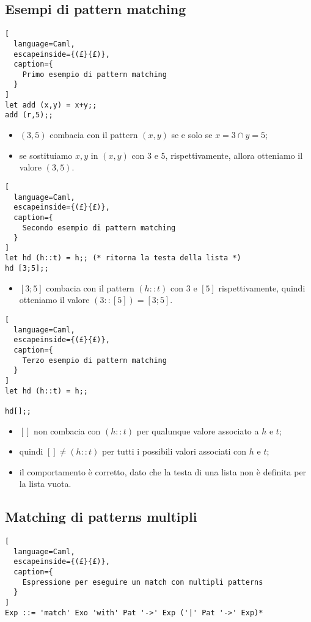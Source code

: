 \subsection{Esempi di pattern matching}
\begin{lstlisting}[
  language=Caml,
  escapeinside={(£}{£)},
  caption={
    Primo esempio di pattern matching
  }
]
let add (x,y) = x+y;;
add (r,5);;
\end{lstlisting}
\begin{itemize}
  \item $(3,5)$ combacia con il pattern $(x,y)$ se e solo se $x=3\cap
    y=5$;
  \item se sostituiamo $x,y$ in $(x,y)$ con $3$ e $5$,
    rispettivamente, allora otteniamo il valore $(3,5)$.
\end{itemize}

\begin{lstlisting}[
  language=Caml,
  escapeinside={(£}{£)},
  caption={
    Secondo esempio di pattern matching
  }
]
let hd (h::t) = h;; (* ritorna la testa della lista *)
hd [3;5];;
\end{lstlisting}
\begin{itemize}
  \item $[3;5]$ combacia con il pattern $(h::t)$ con $3$ e $[5]$
    rispettivamente, quindi otteniamo il valore $(3::[5])=[3;5]$.
\end{itemize}

\begin{lstlisting}[
  language=Caml,
  escapeinside={(£}{£)},
  caption={
    Terzo esempio di pattern matching
  }
]
let hd (h::t) = h;;

hd[];;
\end{lstlisting}
\begin{itemize}
  \item $[]$ non combacia con $(h::t)$ per qualunque valore associato a $h$ e
    $t$;
  \item quindi $[]\neq(h::t)$ per tutti i possibili valori associati con $h$ e
    $t$;
  \item il comportamento è corretto, dato che la testa di una lista non è
    definita per la lista vuota.
\end{itemize}

\subsection{Matching di patterns multipli}
\begin{lstlisting}[
  language=Caml,
  escapeinside={(£}{£)},
  caption={
    Espressione per eseguire un match con multipli patterns
  }
]
Exp ::= 'match' Exo 'with' Pat '->' Exp ('|' Pat '->' Exp)*
\end{lstlisting}

